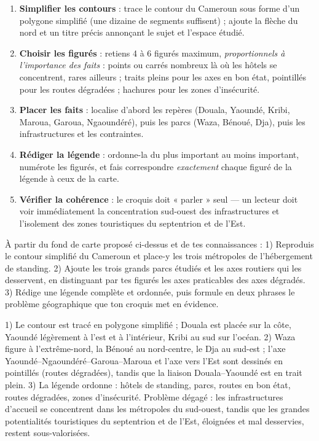\documentclass[11pt]{article}
\begin{document}
\begin{methode}
\begin{enumerate}
\item \textbf{Simplifier les contours} : trace le contour du Cameroun sous forme d'un polygone simplifié (une dizaine de segments suffisent) ; ajoute la flèche du nord et un titre précis annonçant le sujet et l'espace étudié.
\item \textbf{Choisir les figurés} : retiens 4 à 6 figurés maximum, \emph{proportionnels à l'importance des faits} : points ou carrés nombreux là où les hôtels se concentrent, rares ailleurs ; traits pleins pour les axes en bon état, pointillés pour les routes dégradées ; hachures pour les zones d'insécurité.
\item \textbf{Placer les faits} : localise d'abord les repères (Douala, Yaoundé, Kribi, Maroua, Garoua, Ngaoundéré), puis les parcs (Waza, Bénoué, Dja), puis les infrastructures et les contraintes.
\item \textbf{Rédiger la légende} : ordonne-la du plus important au moins important, numérote les figurés, et fais correspondre \emph{exactement} chaque figuré de la légende à ceux de la carte.
\item \textbf{Vérifier la cohérence} : le croquis doit « parler » seul — un lecteur doit voir immédiatement la concentration sud-ouest des infrastructures et l'isolement des zones touristiques du septentrion et de l'Est.
\end{enumerate}
\end{methode}

\begin{exercice}
À partir du fond de carte proposé ci-dessus et de tes connaissances : 1) Reproduis le contour simplifié du Cameroun et place-y les trois métropoles de l'hébergement de standing. 2) Ajoute les trois grands parcs étudiés et les axes routiers qui les desservent, en distinguant par tes figurés les axes praticables des axes dégradés. 3) Rédige une légende complète et ordonnée, puis formule en deux phrases le problème géographique que ton croquis met en évidence.
\end{exercice}

\begin{corrige}[Exercice 1]
1) Le contour est tracé en polygone simplifié ; Douala est placée sur la côte, Yaoundé légèrement à l'est et à l'intérieur, Kribi au sud sur l'océan. 2) Waza figure à l'extrême-nord, la Bénoué au nord-centre, le Dja au sud-est ; l'axe Yaoundé--Ngaoundéré--Garoua--Maroua et l'axe vers l'Est sont dessinés en pointillés (routes dégradées), tandis que la liaison Douala--Yaoundé est en trait plein. 3) La légende ordonne : hôtels de standing, parcs, routes en bon état, routes dégradées, zones d'insécurité. Problème dégagé : les infrastructures d'accueil se concentrent dans les métropoles du sud-ouest, tandis que les grandes potentialités touristiques du septentrion et de l'Est, éloignées et mal desservies, restent sous-valorisées.
\end{corrige}
\end{document}
